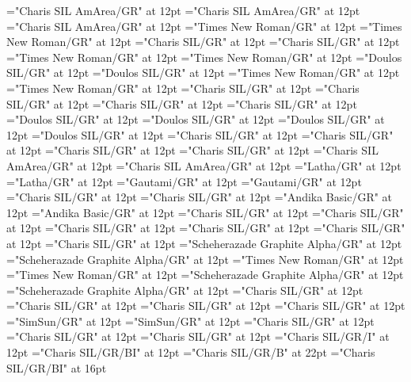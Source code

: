 \documentclass[a4paper,twoside]{article}
\begin{document}
\font\spanmxbfonipa="Charis SIL AmArea/GR" at 12pt
\font\divmxb="Charis SIL AmArea/GR" at 12pt
\font\spanmxb="Charis SIL AmArea/GR" at 12pt
\font\divmy="Times New Roman/GR" at 12pt
\font\spanmy="Times New Roman/GR" at 12pt
\font\divne="Charis SIL/GR" at 12pt
\font\spanne="Charis SIL/GR" at 12pt
\font\divpt="Times New Roman/GR" at 12pt
\font\spanpt="Times New Roman/GR" at 12pt
\font\divqaafonipaxyii="Doulos SIL/GR" at 12pt
\font\spanqaafonipaxyii="Doulos SIL/GR" at 12pt
\font\divqaaxlel="Times New Roman/GR" at 12pt
\font\spanqaaxlel="Times New Roman/GR" at 12pt
\font\divro="Charis SIL/GR" at 12pt
\font\spanro="Charis SIL/GR" at 12pt
\font\divru="Charis SIL/GR" at 12pt
\font\spanru="Charis SIL/GR" at 12pt
\font\divsehfonipaxetic="Doulos SIL/GR" at 12pt
\font\spansehfonipaxetic="Doulos SIL/GR" at 12pt
\font\divsehfonipa="Doulos SIL/GR" at 12pt
\font\spansehfonipa="Doulos SIL/GR" at 12pt
\font\divsehZxxxxaudio="Charis SIL/GR" at 12pt
\font\spansehZxxxxaudio="Charis SIL/GR" at 12pt
\font\divseh="Charis SIL/GR" at 12pt
\font\spanseh="Charis SIL/GR" at 12pt
\font\divstp="Charis SIL AmArea/GR" at 12pt
\font\spanstp="Charis SIL AmArea/GR" at 12pt
\font\divta="Latha/GR" at 12pt
\font\spanta="Latha/GR" at 12pt
\font\divte="Gautami/GR" at 12pt
\font\spante="Gautami/GR" at 12pt
\font\divth="Charis SIL/GR" at 12pt
\font\spanth="Charis SIL/GR" at 12pt
\font\divtpi="Andika Basic/GR" at 12pt
\font\spantpi="Andika Basic/GR" at 12pt
\font\divtrfonipaxemic="Charis SIL/GR" at 12pt
\font\spantrfonipaxemic="Charis SIL/GR" at 12pt
\font\divtrfonipa="Charis SIL/GR" at 12pt
\font\spantrfonipa="Charis SIL/GR" at 12pt
\font\divtr="Charis SIL/GR" at 12pt
\font\spantr="Charis SIL/GR" at 12pt
\font\divurArab="Scheherazade Graphite Alpha/GR" at 12pt
\font\spanurArab="Scheherazade Graphite Alpha/GR" at 12pt
\font\divurxind="Times New Roman/GR" at 12pt
\font\spanurxind="Times New Roman/GR" at 12pt
\font\divur="Scheherazade Graphite Alpha/GR" at 12pt
\font\spanur="Scheherazade Graphite Alpha/GR" at 12pt
\font\divvi="Charis SIL/GR" at 12pt
\font\spanvi="Charis SIL/GR" at 12pt
\font\divzhCNpinyin="Charis SIL/GR" at 12pt
\font\spanzhCNpinyin="Charis SIL/GR" at 12pt
\font\divzhCN="SimSun/GR" at 12pt
\font\spanzhCN="SimSun/GR" at 12pt
\font\picturepictureRight="Charis SIL/GR" at 12pt
\font\imgpicturedivpictureLeft="Charis SIL/GR" at 12pt
\font\scrBookscrBody="Charis SIL/GR" at 12pt
\font\scrBookNamezxxscrBookscrBody="Charis SIL/GR/I" at 12pt
\font\scrBookCodezxxscrBookscrBody="Charis SIL/GR/BI" at 12pt
\font\TitleMainscrBookscrBody="Charis SIL/GR/B" at 22pt
\font\TitleSecondaryzxxTitleMainscrBookscrBody="Charis SIL/GR/BI" at 16pt
\end{document}
